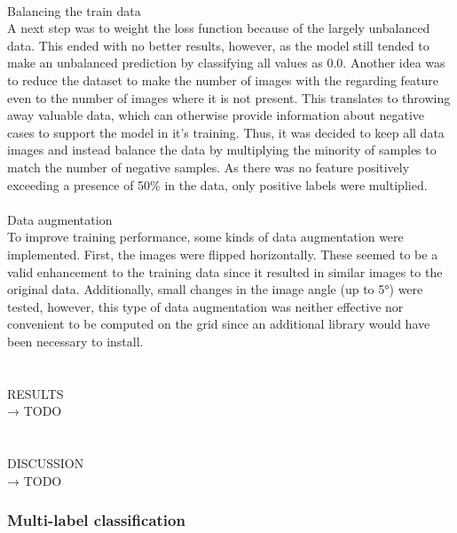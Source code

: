  \\
Balancing the train data \\
A next step was to weight the loss function because of the largely unbalanced data. This ended with no better results, however, as the model still tended to make an unbalanced prediction by classifying all values as 0.0. Another idea was to reduce the dataset to make the number of images with the regarding feature even to the number of images where it is not present. This translates to throwing away valuable data, which can otherwise provide information about negative cases to support the model in it’s training. Thus, it was decided to keep all data images and instead balance the data by multiplying the minority of samples to match the number of negative samples. As there was no feature positively exceeding a presence of 50\% in the data, only positive labels were multiplied. \\
\\
Data augmentation \\
To improve training performance, some kinds of data augmentation were implemented. First, the images were flipped horizontally. These seemed to be a valid enhancement to the training data since it resulted in similar images to the original data. Additionally, small changes in the image angle (up to 5°) were tested, however, this type of data augmentation was neither effective nor convenient to be computed on the grid since an additional library would have been necessary to install. \\
\\
\\
RESULTS \\
→ TODO \\
\\
\\
DISCUSSION \\
→ TODO \\



\subsubsection{Multi-label classification}


